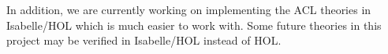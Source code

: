 In addition, we are currently working on implementing the ACL theories in Isabelle/HOL which is much easier
to work with.  Some future theories in this project may be verified in Isabelle/HOL instead of HOL.

